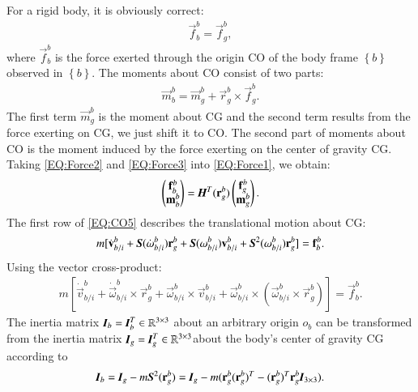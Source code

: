 For a rigid body, it is obviously correct:
\begin{align}
\vec{f}_{b}^{b}=\vec{f}_{g}^{b}\label{EQ:Force2}, 
\end{align}
where $\vec{f}_{b}^{b}$ is the force exerted through the origin CO of the body frame $\left\{ b \right\}$ observed in $\left\{ b \right\}$.
The moments about CO consist of two parts:
\begin{align}
\vec{m}_{b}^{b}=\vec{m}_{g}^{b}+\vec{r}_{g}^{b}\times \vec{f}^{b}_{g}\label{EQ:Force3}.
\end{align}
The first term $\vec{m}_{g}^{b}$ is the moment about CG and the second term results from the force exerting on CG, we just shift it to CO. The second part of moments about CO is the moment induced by the force exerting on the center of gravity CG.
Taking \ref{EQ:Force2} and \ref{EQ:Force3} into \ref{EQ:Force1}, we obtain: 
\begin{align}
\begin{pmatrix}
\vec{f}_{b}^{b}\\
\vec{m}_{b}^{b}
\end{pmatrix}=
\emph{\textbf{H}}^{T}(\vec{r}_{g}^{b})
\begin{pmatrix}
\vec{f}^{b}_{g} \\
\vec{m}^{b}_{g}
\end{pmatrix}\label{EQ:CO6}.
\end{align}
The first row of \ref{EQ:CO5} describes the translational motion about CG:
\begin{align}
m[\dot{\vec{v}}^{b}_{b/i}+\emph{\textbf{S}}(\dot{\vec{\omega}}^{b}_{b/i})\vec{r}^{b}_{g}+
\emph{\textbf{S}}(\vec{\omega}^{b}_{b/i})\vec{v}^{b}_{b/i}+
\emph{\textbf{S}}^{2}(\vec{\omega}^{b}_{b/i})\vec{r}^{b}_{g}
]=\vec{f}^{b}_{b}.
\end{align}
Using the vector cross-product:
\begin{align}
m[\dot{\vec{v}}^{b}_{b/i}+\dot{\vec{\omega}}^{b}_{b/i}\times\vec{r}^{b}_{g}
+\vec{\omega}^{b}_{b/i}\times\vec{v}^{b}_{b/i}+\vec{\omega}^{b}_{b/i}\times(\vec{\omega}^{b}_{b/i}\times\vec{r}_{g}^{b})]=\vec{f}^{b}_{b}.
\end{align}
The inertia matrix $\emph{\textbf{I}}_{b}=\emph{\textbf{I}}_{b}^{T} \in \mathbb{R}^{3 \times 3}$ about an arbitrary origin $o_{b}$ can be transformed from the inertia matrix $\emph{\textbf{I}}_{g}=\emph{\textbf{I}}_{g}^{T} \in \mathbb{R}^{3 \times 3}$about the body's center of gravity CG according to
\begin{align}
\emph{\textbf{I}}_{b}=\emph{\textbf{I}}_{g}-m\emph{\textbf{S}}^{2}(\vec{r}^{b}_{g})=\emph{\textbf{I}}_{g}-m(\vec{r}^{b}_{g}(\vec{r}^{b}_{g})^{T}-(\vec{r}^{b}_{g})^{T}\vec{r}^{b}_{g} \bigskip \emph{\textbf{I}}_{3\times 3}).
\end{align}

